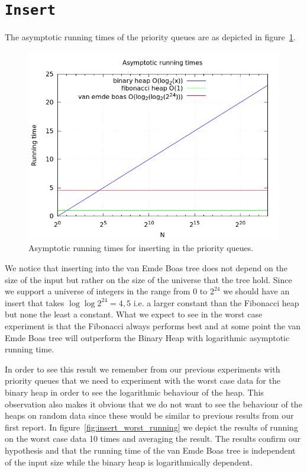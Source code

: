 \documentclass[a4paper,oneside,article,11pt]{memoir}
\begin{document}
\section{\texttt{Insert}}
The asymptotic running times of the priority queues are as depicted in figure~\ref{fig:asymptotic_insert}.

\begin{figure}[H]
\includegraphics[scale=0.5]{../res2/inserts/runtime_plot.png}
\caption{Asymptotic running times for inserting in the priority queues.}
\label{fig:asymptotic_insert}
\end{figure}

We notice that inserting into the van Emde Boas tree does not depend on the size of the input but rather on the size of the universe that the tree hold. Since we support a universe of integers in the range from $0$ to $2^{24}$ we should have an insert that takes $\log\log 2^{24} = 4,5$ i.e. a larger constant than the Fibonacci heap but none the least a constant. What we expect to see in the worst case experiment is that the Fibonacci always performs best and at some point the van Emde Boas tree will outperform the Binary Heap with logarithmic asymptotic running time.

In order to see this result we remember from our previous experiments with priority queues that we need to experiment with the worst case data for the binary heap in order to see the logarithmic behaviour of the heap. This observation also makes it obvious that we do not want to see the behaviour of the heaps on random data since these would be similar to previous results from our first report. In figure~\ref{fig:insert_worst_running} we depict the results of running on the worst case data 10 times and averaging the result. The results confirm our hypothesis and that the running time of the van Emde Boas tree is independent of the input size while the binary heap is logarithmically dependent.
\end{document}
